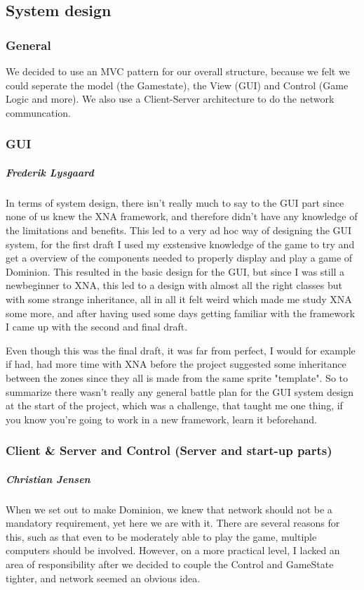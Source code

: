 \subsection{System design}
\subsubsection{General}
We decided to use an MVC pattern for our overall structure, because we felt we could seperate the model (the Gamestate), the View (GUI) and Control (Game Logic and more). We also use a Client-Server architecture to do the network communcation.

\subsubsection{GUI}
\subparagraph{Frederik Lysgaard}
In terms of system design, there isn't really much to say to the GUI part since none of us knew the XNA framework, and therefore didn't have any knowledge of the limitations and benefits.
This led to a very ad hoc way of designing the GUI system, for the first draft I used my exstensive knowledge of the game to try and get a overview of the components needed to properly display and play a game of Dominion. 
This resulted in the basic design for the GUI, but since I was still a newbeginner to XNA, this led to a design with almost all the right classes but with some strange inheritance, all in all it felt weird which made me study XNA some more, and after having used some days getting familiar with the framework I came up with the second and final draft.

Even though this was the final draft, it was far from perfect, I would for example if had, had more time with XNA before the project suggested some inheritance between the zones since they all is made from the same sprite "template". So to summarize there wasn't really any general battle plan for the GUI system design at the start of the project, which was a challenge, that taught me one thing,
if you know you're going to work in a new framework, learn it beforehand.

\subsubsection{Client \& Server and Control (Server and start-up parts)}
\subparagraph{Christian Jensen}
When we set out to make Dominion, we knew that network should not be a mandatory requirement, yet here we are with it.
There are several reasons for this, such as that even to be moderately able to play the game, multiple computers should be involved.
However, on a more practical level, I lacked an area of responsibility after we decided to couple the Control and GameState tighter, and network
seemed an obvious idea.

